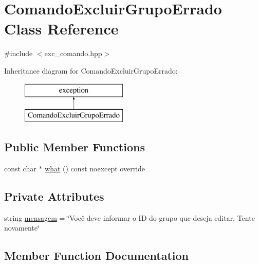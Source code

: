 \hypertarget{classComandoExcluirGrupoErrado}{}\section{Comando\+Excluir\+Grupo\+Errado Class Reference}
\label{classComandoExcluirGrupoErrado}


{\ttfamily \#include $<$exc\+\_\+comando.\+hpp$>$}

Inheritance diagram for Comando\+Excluir\+Grupo\+Errado\+:\begin{figure}[H]
\begin{center}
\leavevmode
\includegraphics[height=2.000000cm]{classComandoExcluirGrupoErrado}
\end{center}
\end{figure}
\subsection*{Public Member Functions}
\begin{DoxyCompactItemize}
\item 
const char $\ast$ \hyperlink{classComandoExcluirGrupoErrado_abdf7deaa2a0467a556f57ed2d54b52d1}{what} () const noexcept override
\end{DoxyCompactItemize}
\subsection*{Private Attributes}
\begin{DoxyCompactItemize}
\item 
string \hyperlink{classComandoExcluirGrupoErrado_a3d55ba220737df2b3a454360ca1c7513}{mensagem} = \char`\"{}Você deve informar o ID do grupo que deseja editar. Tente novamente\char`\"{}
\end{DoxyCompactItemize}


\subsection{Member Function Documentation}
\mbox{\label{classComandoExcluirGrupoErrado_abdf7deaa2a0467a556f57ed2d54b52d1}} 
